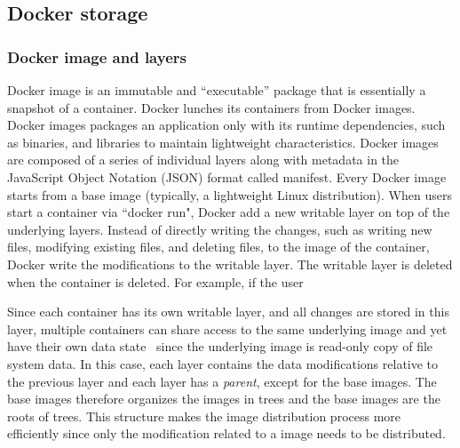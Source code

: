 \subsection{Docker storage}

\subsubsection{Docker image and layers}

Docker image is an immutable and ``executable'' package that is essentially a snapshot of a container. Docker lunches its containers from Docker images.
%
%
Docker images packages an application only with its runtime dependencies, such as binaries, and libraries to maintain lightweight characteristics. Docker images are composed of a series of individual layers along with metadata in the JavaScript Object Notation (JSON) format called manifest. Every Docker image starts from a base image (typically, a lightweight Linux distribution). When users start a container via ``docker run", Docker add a new writable layer on top of the underlying layers. Instead of directly writing the changes, such as writing new files, modifying existing files, and deleting files, to the image of the container, Docker write the modifications to the writable layer. The writable layer is deleted when the container is deleted. For example, if the user

 

Since each container has its own writable layer, and all changes are stored in this layer, multiple containers can share access to the same underlying image and yet have their own data state~\cite{xxx} since the underlying image is read-only copy of file system data. In this case, each layer contains the data modifications relative to the previous layer and each layer has a \textit{parent}, except for the base images. The base images therefore organizes the images in trees and the base images are the roots of trees. This structure makes the image distribution process more efficiently since only the modification related to a image needs to be distributed.

%
%
%



